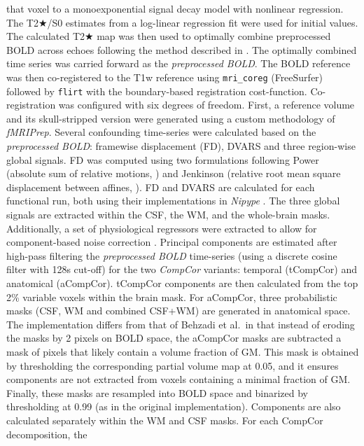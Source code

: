 \documentclass[
]{article}
\begin{document}
\begin{description}
that voxel to a monoexponential signal decay model with nonlinear
regression. The T2★/S0 estimates from a log-linear regression fit were
used for initial values. The calculated T2★ map was then used to
optimally combine preprocessed BOLD across echoes following the method
described in \citep{posse_t2s}. The optimally combined time series was
carried forward as the \emph{preprocessed BOLD}. The BOLD reference was
then co-registered to the T1w reference using \texttt{mri\_coreg}
(FreeSurfer) followed by \texttt{flirt} \citep[FSL
6.0.5.1:57b01774,][]{flirt} with the boundary-based registration
\citep{bbr} cost-function. Co-registration was configured with six
degrees of freedom. First, a reference volume and its skull-stripped
version were generated using a custom methodology of \emph{fMRIPrep}.
Several confounding time-series were calculated based on the
\emph{preprocessed BOLD}: framewise displacement (FD), DVARS and three
region-wise global signals. FD was computed using two formulations
following Power (absolute sum of relative motions,
\citet{power_fd_dvars}) and Jenkinson (relative root mean square
displacement between affines, \citet{mcflirt}). FD and DVARS are
calculated for each functional run, both using their implementations in
\emph{Nipype} \citep[following the definitions by][]{power_fd_dvars}.
The three global signals are extracted within the CSF, the WM, and the
whole-brain masks. Additionally, a set of physiological regressors were
extracted to allow for component-based noise correction
\citep[\emph{CompCor},][]{compcor}. Principal components are estimated
after high-pass filtering the \emph{preprocessed BOLD} time-series
(using a discrete cosine filter with 128s cut-off) for the two
\emph{CompCor} variants: temporal (tCompCor) and anatomical (aCompCor).
tCompCor components are then calculated from the top 2\% variable voxels
within the brain mask. For aCompCor, three probabilistic masks (CSF, WM
and combined CSF+WM) are generated in anatomical space. The
implementation differs from that of Behzadi et al.~in that instead of
eroding the masks by 2 pixels on BOLD space, the aCompCor masks are
subtracted a mask of pixels that likely contain a volume fraction of GM.
This mask is obtained by thresholding the corresponding partial volume
map at 0.05, and it ensures components are not extracted from voxels
containing a minimal fraction of GM. Finally, these masks are resampled
into BOLD space and binarized by thresholding at 0.99 (as in the
original implementation). Components are also calculated separately
within the WM and CSF masks. For each CompCor decomposition, the

\end{description}
\end{document}
